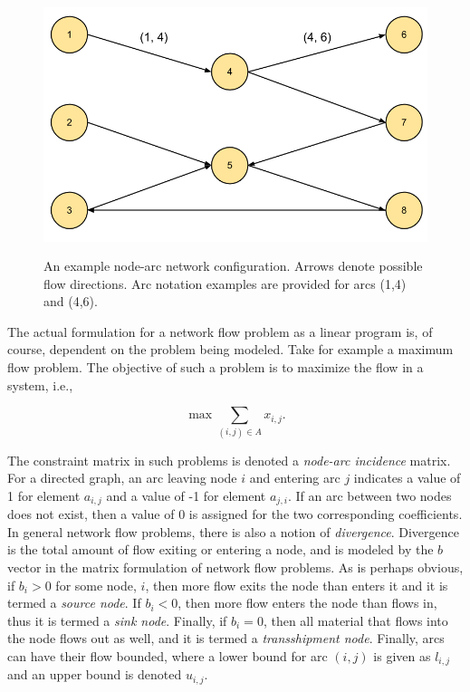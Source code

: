 \begin{figure}[H]
  \begin{center}
    \includegraphics[height=7.5cm]{./chapters/1-intro/figs/node-arcs.png}
  \caption{An example node-arc network configuration. Arrows denote possible
    flow directions. Arc notation examples are provided for arcs (1,4) and
    (4,6).}
  \label{fig:node-arcs}
  \end{center}
\end{figure}

The actual formulation for a network flow problem as a linear program is, of
course, dependent on the problem being modeled. Take for example a maximum flow
problem. The objective of such a problem is to maximize the flow in a system,
i.e.,

\begin{equation}
\max \sum_{(i, j) \in A} x_{i,j}.
\end{equation}

The constraint matrix in such problems is denoted a \textit{node-arc incidence}
matrix. For a directed graph, an arc leaving node $i$ and entering arc $j$
indicates a value of 1 for element $a_{i,j}$ and a value of -1 for element
$a_{j,i}$. If an arc between two nodes does not exist, then a value of 0 is
assigned for the two corresponding coefficients. In general network flow
problems, there is also a notion of \textit{divergence}. Divergence is the total
amount of flow exiting or entering a node, and is modeled by the $b$ vector in
the matrix formulation of network flow problems. As is perhaps obvious, if $b_i
> 0$ for some node, $i$, then more flow exits the node than enters it and it is
termed a \textit{source node}. If $b_i < 0$, then more flow enters the node than
flows in, thus it is termed a \textit{sink node}. Finally, if $b_i = 0$, then
all material that flows into the node flows out as well, and it is termed a
\textit{transshipment node}. Finally, arcs can have their flow bounded, where a
lower bound for arc $(i, j)$ is given as $l_{i,j}$ and an upper bound is denoted
$u_{i,j}$.

